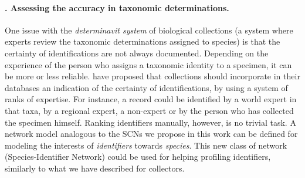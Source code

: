 \paragraph*{\theApplicationCase. Assessing the accuracy in taxonomic determinations.}
One issue with the \textit{determinavit system} of biological collections (a system where experts review the taxonomic determinations assigned to species) is that the certainty of identifications are not always documented.
Depending on the experience of the person who assigns a taxonomic identity to a specimen, it can be more or less reliable. 
 have proposed that collections should incorporate in their databases an indication of the certainty of identifications, by using a system of ranks of expertise. %
For instance, a record could be identified by a world expert in that taxa, by a regional expert, a non-expert or by the person who has collected the specimen himself.
Ranking identifiers manually, however, is no trivial task.
%
A network model analogous to the SCNs we propose in this work can be defined for modeling the interests of \textit{identifiers} towards \textit{species}.
This new class of network (Species-Identifier Network) could be used for helping profiling identifiers, similarly to what we have described for collectors.










